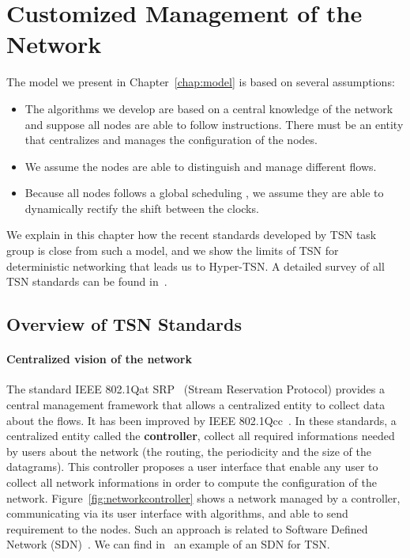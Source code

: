 \section{Customized Management of the Network}
\label{sec:TSNqbv}


The model we present in Chapter~\ref{chap:model} is based on several assumptions:
\begin{itemize}
\item The algorithms we develop are based on a central knowledge of the network and suppose all nodes are able to follow instructions. There must be an entity that centralizes and manages the configuration of the nodes.
\item We assume the nodes are able to distinguish and manage different flows.
\item Because all nodes follows a global scheduling , we assume they are able to dynamically rectify the shift between the clocks.
\end{itemize}

We explain in this chapter how the recent standards developed by TSN task group is close from such a model, and we show the limits of TSN for deterministic networking that leads us to Hyper-TSN. A detailed survey of all TSN standards can be found in~\cite{8458130}. 


\subsection{Overview of TSN Standards}


\paragraph{Centralized vision of the network}
The standard IEEE 802.1Qat SRP~\cite{article} (Stream Reservation Protocol) provides a central management framework that allows a centralized entity to collect data about the flows. It has been improved by IEEE 802.1Qcc~\cite{6755436}. In these standards, a centralized entity called the \textbf{controller}, collect all required informations needed by users about the network (the routing, the periodicity and the size of the datagrams). This controller proposes a user interface that enable any user to collect all network informations in order to compute the configuration of the network. Figure~\ref{fig:networkcontroller} shows a network managed by a controller, communicating via its user interface with algorithms, and able to send requirement to the nodes. Such an approach is related to Software Defined Network (SDN)~\cite{li2015software}. We can find in~\cite{7356556} an example of an SDN for TSN.


